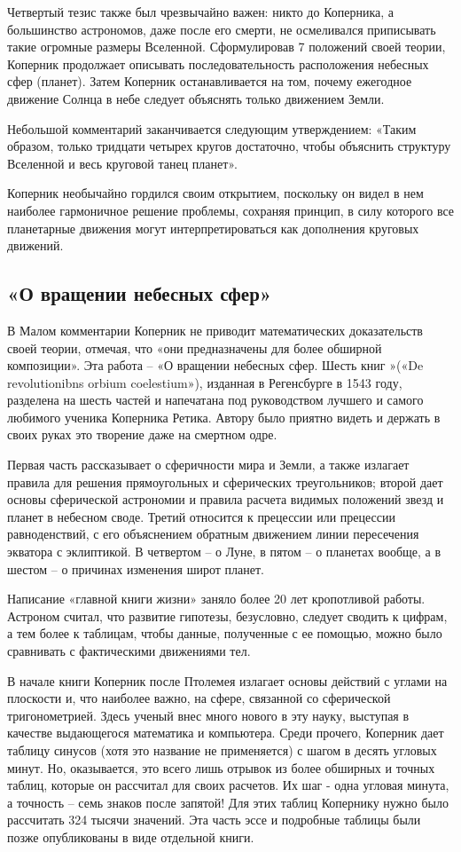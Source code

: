 \documentclass[a4paper, 14pt]{extreport}
\begin{document}
Четвертый тезис также был чрезвычайно важен: никто до Коперника, а
большинство астрономов, даже после его смерти, не осмеливался
приписывать такие огромные размеры Вселенной. Сформулировав 7 положений
своей теории, Коперник продолжает описывать последовательность
расположения небесных сфер (планет). Затем Коперник останавливается на
том, почему ежегодное движение Солнца в небе следует объяснять только
движением Земли.

Небольшой комментарий заканчивается следующим утверждением: «Таким
образом, только тридцати четырех кругов достаточно, чтобы объяснить
структуру Вселенной и весь круговой танец планет».

Коперник необычайно гордился своим открытием, поскольку он видел в нем
наиболее гармоничное решение проблемы, сохраняя принцип, в силу которого
все планетарные движения могут интерпретироваться как дополнения
круговых движений.

\subsection{«О вращении небесных сфер»}

В Малом комментарии Коперник не приводит математических доказательств
своей теории, отмечая, что «они предназначены для более обширной
композиции». Эта работа -- «О вращении небесных сфер. Шесть книг »(«De
revolutionibns orbium coelestium»), изданная в Регенсбурге в 1543 году,
разделена на шесть частей и напечатана под руководством лучшего и самого
любимого ученика Коперника Ретика. Автору было приятно видеть и держать
в своих руках это творение даже на смертном одре.

Первая часть рассказывает о сферичности мира и Земли, а также излагает
правила для решения прямоугольных и сферических треугольников; второй
дает основы сферической астрономии и правила расчета видимых положений
звезд и планет в небесном своде. Третий относится к прецессии или
прецессии равноденствий, с его объяснением обратным движением линии
пересечения экватора с эклиптикой. В четвертом -- о Луне, в пятом -- о
планетах вообще, а в шестом -- о причинах изменения широт планет.

Написание «главной книги жизни» заняло более 20 лет кропотливой работы.
Астроном считал, что развитие гипотезы, безусловно, следует сводить к
цифрам, а тем более к таблицам, чтобы данные, полученные с ее помощью,
можно было сравнивать с фактическими движениями тел.

В начале книги Коперник после Птолемея излагает основы действий с углами
на плоскости и, что наиболее важно, на сфере, связанной со сферической
тригонометрией. Здесь ученый внес много нового в эту науку, выступая в
качестве выдающегося математика и компьютера. Среди прочего, Коперник
дает таблицу синусов (хотя это название не применяется) с шагом в десять
угловых минут. Но, оказывается, это всего лишь отрывок из более обширных
и точных таблиц, которые он рассчитал для своих расчетов. Их шаг - одна
угловая минута, а точность -- семь знаков после запятой! Для этих таблиц
Копернику нужно было рассчитать 324 тысячи значений. Эта часть эссе и
подробные таблицы были позже опубликованы в виде отдельной книги.
\end{document}
